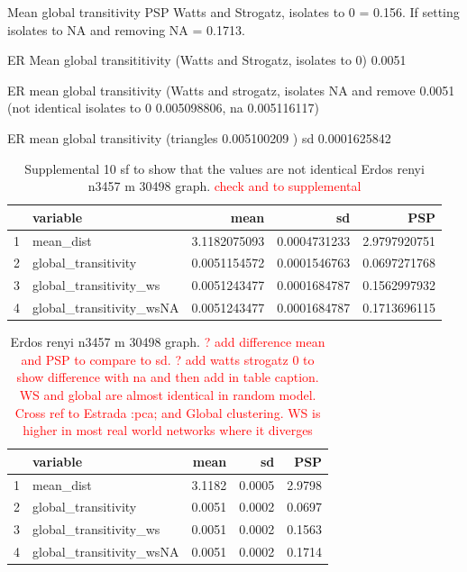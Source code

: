 Mean global transitivity PSP Watts and Strogatz, isolates to 0 = 0.156. If setting isolates to NA and removing NA = 0.1713.

ER Mean global transititivity (Watts and Strogatz, isolates to 0) 0.0051

ER mean global transitivity (Watts and strogatz, isolates NA and remove 0.0051 (not identical isolates to 0 0.005098806, na 0.005116117)

ER mean global transitivity (triangles 0.005100209 ) sd 0.0001625842

\begin{table}[ht]
\centering
\begin{tabular}{rlrrr}
  \hline
 & variable & mean & sd & PSP \\ 
  \hline
1 & mean\_dist & 3.1182075093 & 0.0004731233 & 2.9797920751 \\ 
  2 & global\_transitivity & 0.0051154572 & 0.0001546763 & 0.0697271768 \\ 
  3 & global\_transitivity\_ws & 0.0051243477 & 0.0001684787 & 0.1562997932 \\ 
  4 & global\_transitivity\_wsNA & 0.0051243477 & 0.0001684787 & 0.1713696115 \\ 
   \hline
\end{tabular}
\caption{Supplemental 10 sf to show that the values are not identical Erdos renyi n3457 m 30498 graph. \textcolor{red}{check and to supplemental}}
\label{tab:transitivity_erdos_renyi 10sf}
\end{table}

\begin{table}[ht]
\centering
\begin{tabular}{rlrrr}
  \hline
 & variable & mean & sd & PSP \\ 
  \hline
1 & mean\_dist & 3.1182 & 0.0005 & 2.9798 \\ 
  2 & global\_transitivity & 0.0051 & 0.0002 & 0.0697 \\ 
  3 & global\_transitivity\_ws & 0.0051 & 0.0002 & 0.1563 \\ 
  4 & global\_transitivity\_wsNA & 0.0051 & 0.0002 & 0.1714 \\ 
   \hline
\end{tabular}
\caption{Erdos renyi n3457 m 30498 graph. \textcolor{red}{? add difference mean and PSP to compare to sd. ? add watts strogatz 0 to show difference with na and then add in table caption. WS and global are almost identical in random model. Cross ref to Estrada :pca; and Global clustering. WS is higher in most real world networks where it diverges}}
\label{tab:transitivity_erdos_renyi}
\end{table}

